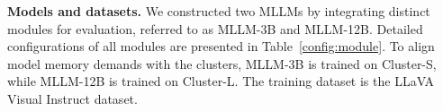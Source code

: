 \documentclass[conference]{IEEEtran}
\begin{document}


\textbf{Models and datasets.}
We constructed two MLLMs by integrating distinct modules for evaluation, referred to as MLLM-3B and MLLM-12B.
Detailed configurations of all modules are presented in Table~\ref{config:module}.
To align model memory demands with the clusters, MLLM-3B is trained on Cluster-S, while MLLM-12B is trained on Cluster-L. 
The training dataset is the LLaVA Visual Instruct dataset.
\end{document}
